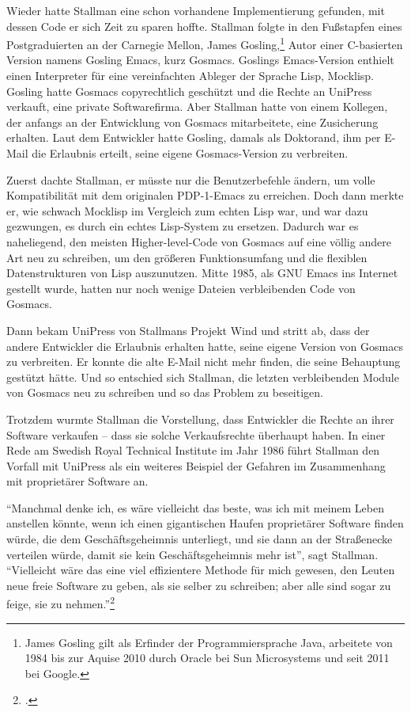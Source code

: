 Wieder hatte Stallman eine schon vorhandene Implementierung gefunden, mit dessen Code er sich Zeit zu sparen hoffte. Stallman folgte in den Fußstapfen eines Postgraduierten an der Carnegie Mellon, James Gosling,\footnote{James Gosling gilt als Erfinder der Programmiersprache Java, arbeitete von 1984 bis zur Aquise 2010 durch Oracle bei Sun Microsystems und seit 2011 bei Google.} Autor einer C-basierten Version namens Gosling Emacs, kurz Gosmacs. Goslings Emacs-Version enthielt einen Interpreter für eine vereinfachten Ableger der Sprache Lisp, Mocklisp. Gosling hatte Gosmacs copyrechtlich geschützt und die Rechte an UniPress verkauft, eine private Softwarefirma. Aber Stallman hatte von einem Kollegen, der anfangs an der Entwicklung von Gosmacs mitarbeitete, eine Zusicherung erhalten. Laut dem Entwickler hatte Gosling, damals als Doktorand, ihm per E-Mail die Erlaubnis erteilt, seine eigene Gosmacs-Version zu verbreiten.

Zuerst dachte Stallman, er müsste nur die Benutzerbefehle ändern, um volle Kompatibilität mit dem originalen PDP-1-Emacs zu erreichen. Doch dann merkte er, wie schwach Mocklisp im Vergleich zum echten Lisp war, und war dazu gezwungen, es durch ein echtes Lisp-System zu ersetzen. Dadurch war es naheliegend, den meisten Higher-level-Code von Gosmacs auf eine völlig andere Art neu zu schreiben, um den größeren Funktionsumfang und die flexiblen Datenstrukturen von Lisp auszunutzen. Mitte 1985, als GNU Emacs ins Internet gestellt wurde, hatten nur noch wenige Dateien verbleibenden Code von Gosmacs.

Dann bekam UniPress von Stallmans Projekt Wind und stritt ab, dass der andere Entwickler die Erlaubnis erhalten hatte, seine eigene Version von Gosmacs zu verbreiten. Er konnte die alte E-Mail nicht mehr finden, die seine Behauptung gestützt hätte. Und so entschied sich Stallman, die letzten verbleibenden Module von Gosmacs neu zu schreiben und so das Problem zu beseitigen.

Trotzdem wurmte Stallman die Vorstellung, dass Entwickler die Rechte an ihrer Software verkaufen – dass sie solche Verkaufsrechte überhaupt haben. In einer Rede am Swedish Royal Technical Institute im Jahr 1986 führt Stallman den Vorfall mit UniPress als ein weiteres Beispiel der Gefahren im Zusammenhang mit proprietärer Software an.

"`Manchmal denke ich, es wäre vielleicht das beste, was ich mit meinem Leben anstellen könnte, wenn ich einen gigantischen Haufen proprietärer Software finden würde, die dem Geschäftsgeheimnis unterliegt, und sie dann an der Straßenecke verteilen würde, damit sie kein Geschäftsgeheimnis mehr ist"', sagt Stallman. "`Vielleicht wäre das eine viel effizientere Methode für mich gewesen, den Leuten neue freie Software zu geben, als sie selber zu schreiben; aber alle sind sogar zu feige, sie zu nehmen."'\footcite[Vgl.][]{rmskth}

